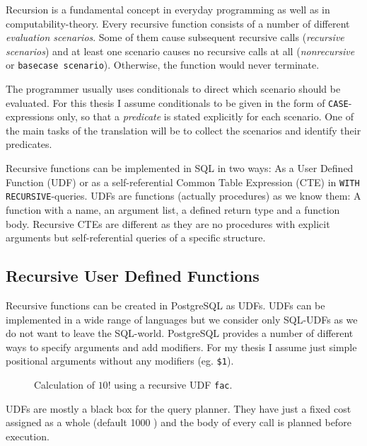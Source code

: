 Recursion is a fundamental concept in everyday programming as well as in computability-theory. Every recursive function consists of a number of different \textit{evaluation scenarios}. Some of them cause subsequent recursive calls (\textit{recursive scenarios}) and at least one scenario causes no recursive calls at all (\textit{nonrecursive} or \texttt{basecase scenario}). Otherwise, the function would never terminate.

The programmer usually uses conditionals to direct which scenario should be evaluated. For this thesis I assume conditionals to be given in the form of \texttt{CASE}-expressions only, so that a \textit{predicate} is stated explicitly for each scenario. One of the main tasks of the translation will be to collect the scenarios and identify their predicates.

Recursive functions can be implemented in SQL in two ways: As a User Defined Function (UDF) or as a self-referential Common Table Expression (CTE) in \texttt{WITH RECURSIVE}-queries. UDFs are functions (actually procedures) as we know them: A function with a name, an argument list, a defined return type and a function body. Recursive CTEs are different as they are no procedures with explicit arguments but self-referential queries of a specific structure.

\subsection{Recursive User Defined Functions}
Recursive functions can be created in PostgreSQL as UDFs. UDFs can be implemented in a wide range of languages but we consider only SQL-UDFs as we do not want to leave the SQL-world. PostgreSQL provides a number of different ways to specify arguments and add modifiers. For my thesis I assume just simple positional arguments without any modifiers (eg. \texttt{\$1}).

\begin{figure}[h!]
    \centering
    \caption{Calculation of $10!$ using a recursive UDF \texttt{fac}.}
    \label{udf:fac}
\end{figure}

UDFs are mostly a black box for the query planner. They have just a fixed cost assigned as a whole (default 1000 \cite[p. 1435]{psql}) and the body of every call is planned before execution.

